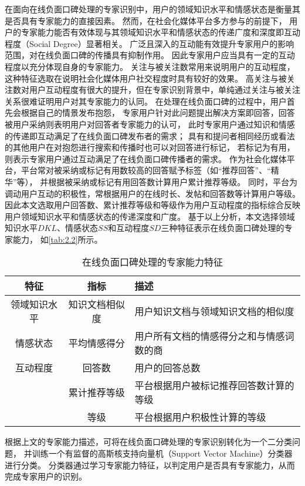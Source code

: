 在面向在线负面口碑处理的专家识别中，用户的领域知识水平和情感状态是衡量其是否具有专家能力的直接因素。
然而，在社会化媒体平台多方参与的前提下，
用户的专家能力能否有效体现与其领域知识水平和情感状态的传递广度和深度即互动程度（Social Degree）显著相关。
广泛且深入的互动能有效提升专家用户的影响范围，对在线负面口碑的传播具有抑制作用。
因此专家用户应当具有一定的互动程度以充分体现自身的专家能力。
关注与被关注数常用来说明用户的互动程度，这种特征选取在说明社会化媒体用户社交程度时具有较好的效果\cite{cha2010measuring}。
高关注与被关注数对用户互动程度有很大的提升，但在专家识别背景中，单纯通过关注与被关注关系很难证明用户对其专家能力的认同。
在处理在线负面口碑的过程中，用户首先会根据自己的情景发布抱怨，
专家用户针对此问题提出解决方案即回答，回答被用户采纳则表明用户对回答者专家能力的认可，
此时专家用户通过知识和情感的传递即互动满足了在线负面口碑发布者的需求；
具有和提问者相同经历或看法的其他用户在对抱怨进行搜索和传播时也可以对回答进行标记，
若标记为有用，则表示专家用户通过互动满足了在线负面口碑传播者的需求。
作为社会化媒体平台，平台常对被采纳或标记有用数较高的回答赋予标签（如“推荐回答”、“精华”等），
并根据被采纳或标记有用回答数计算用户累计推荐等级。
同时，平台为调动用户互动的积极性，常根据用户的在线时长、发帖和回答数等计算用户等级。
因此本文选取用户回答数、累计推荐等级和等级作为用户互动程度的指标综合反映用户领域知识水平和情感状态的传递深度和广度。
基于以上分析，本文选择领域知识水平$DKL$、情感状态$SS$和互动程度$SD$三种特征表示在线负面口碑处理的专家能力，
如\autoref{tab:2.2}所示。
\begin{table}[ht]
    \centering
    \caption{在线负面口碑处理的专家能力特征}\label{tab:2.2}
    \vskip -10pt
    \begin{tabularx}{\textwidth}{ccY}
    \toprule
    特征 & 指标 & 描述 \\
    \midrule
    领域知识水平 & 知识文档相似度 & 用户知识文档与领域知识文档的相似度\\
    情感状态 & 平均情感得分 & 用户所有文档的情感得分之和与情感词数的商 \\
    互动程度 & 回答数 & 用户的回答总数 \\
     & 累计推荐等级 & 平台根据用户被标记推荐回答数计算的等级 \\
     & 等级 &平台根据用户积极性计算的等级 \\
    \bottomrule
    \end{tabularx}
\end{table}

根据上文的专家能力描述，可将在线负面口碑处理的专家识别转化为一个二分类问题，
并训练一个有监督的高斯核支持向量机（Support Vector Machine）分类器进行分类。
分类器通过学习专家能力特征，以判定用户是否具有专家能力，从而完成专家用户的识别。

